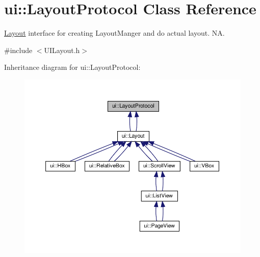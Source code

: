 \hypertarget{classui_1_1LayoutProtocol}{}\section{ui\+:\+:Layout\+Protocol Class Reference}
\label{classui_1_1LayoutProtocol}


\hyperlink{classui_1_1Layout}{Layout} interface for creating Layout\+Manger and do actual layout.  NA.  




{\ttfamily \#include $<$U\+I\+Layout.\+h$>$}



Inheritance diagram for ui\+:\+:Layout\+Protocol\+:
\nopagebreak
\begin{figure}[H]
\begin{center}
\leavevmode
\includegraphics[width=350pt]{classui_1_1LayoutProtocol__inherit__graph}
\end{center}
\end{figure}
